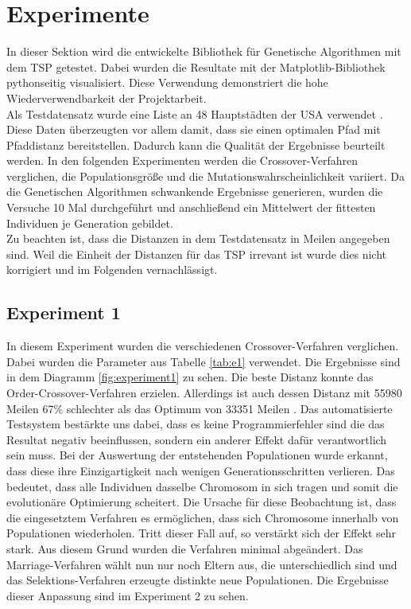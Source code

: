
\section{Experimente}
In dieser Sektion wird die entwickelte Bibliothek für Genetische Algorithmen mit dem TSP getestet. Dabei wurden die Resultate mit der Matplotlib-Bibliothek pythonseitig visualisiert.
Diese Verwendung demonstriert die hohe Wiederverwendbarkeit der Projektarbeit.\\
Als Testdatensatz wurde eine Liste an 48 Hauptstädten der USA verwendet \cite{daten}. Diese Daten überzeugten vor allem damit, dass sie einen optimalen Pfad mit Pfaddistanz bereitstellen. Dadurch kann die Qualität der Ergebnisse beurteilt werden.
In den folgenden Experimenten werden die Crossover-Verfahren verglichen, die Populationsgröße und die Mutationswahrscheinlichkeit variiert. Da die Genetischen Algorithmen schwankende Ergebnisse generieren, wurden die Versuche 10 Mal durchgeführt und anschließend ein Mittelwert der fittesten Individuen je Generation gebildet. \\
Zu beachten ist, dass die Distanzen in dem Testdatensatz in Meilen angegeben sind. Weil die Einheit der Distanzen für das TSP irrevant ist wurde dies nicht korrigiert und im Folgenden vernachlässigt.

\subsection{Experiment 1}
In diesem Experiment wurden die verschiedenen Crossover-Verfahren verglichen. Dabei wurden die Parameter aus Tabelle \ref{tab:e1} verwendet. Die Ergebnisse sind in dem Diagramm \ref{fig:experiment1} zu sehen. 
Die beste Distanz konnte das Order-Crossover-Verfahren erzielen. Allerdings ist auch dessen Distanz mit 55980 Meilen 67\% schlechter als das Optimum von 33351 Meilen . Das automatisierte Testsystem bestärkte uns dabei, dass es keine Programmierfehler sind die das Resultat negativ beeinflussen, sondern ein anderer Effekt dafür verantwortlich sein muss. Bei der Auswertung der entstehenden Populationen wurde erkannt, dass diese ihre Einzigartigkeit nach wenigen Generationsschritten verlieren. Das bedeutet, dass alle Individuen dasselbe Chromosom in sich tragen und somit die evolutionäre Optimierung scheitert.
Die Ursache für diese Beobachtung ist, dass die eingesetztem Verfahren es ermöglichen, dass sich Chromosome innerhalb von Populationen wiederholen. Tritt dieser Fall auf, so verstärkt sich der Effekt sehr stark. Aus diesem Grund wurden die Verfahren minimal abgeändert. Das Marriage-Verfahren wählt nun nur noch Eltern aus, die unterschiedlich sind und das Selektions-Verfahren erzeugte distinkte neue Populationen. Die Ergebnisse dieser Anpassung sind im Experiment 2 zu sehen.

